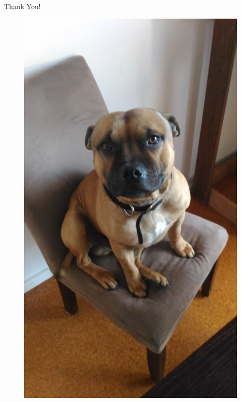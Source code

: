 \documentclass{beamer}
\begin{document}
%
%

\begin{frame}
\begin{center}
{\fontsize{40}{50}\selectfont Thank You!}
\begin{figure}
	\begin{center}
	\includegraphics[scale=0.05]{turbo.jpg}
	\end{center}
  \end{figure}
\end{center}
\end{frame}
\end{document}
